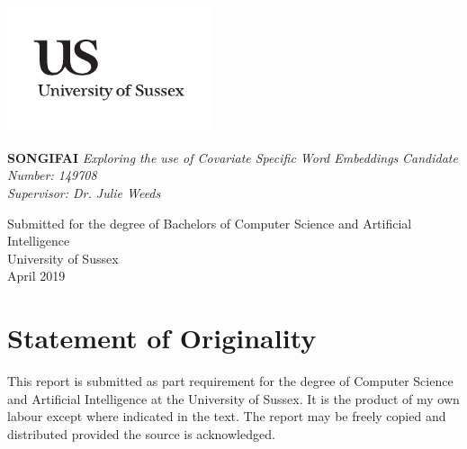 \documentclass[a4paper,11pt]{report}
\begin{document}




\thispagestyle{empty}
\begin{flushright}
\includegraphics[width=6cm]{uslogo}
\end{flushright}	
\vskip40mm
\begin{center}
\huge\textbf{SONGIFAI}
\vskip2mm
\LARGE\textit{Exploring the use of Covariate Specific Word Embeddings}
\vskip5mm
\Large\textit{Candidate Number: 149708} \\
\Large\textit{Supervisor: Dr. Julie Weeds}
\normalsize
\end{center}
\vfill
\begin{flushleft}
\large
Submitted for the degree of Bachelors of Computer Science and Artificial Intelligence  \\
University of Sussex	\\
April 2019
\end{flushleft}		


\chapter*{Statement of Originality}
This report is submitted as part requirement for the degree of Computer Science and Artificial Intelligence at the University of Sussex. It is the product of my own labour except where indicated in the text. The report may be freely copied and distributed provided the source is acknowledged. 
	
\end{document}
